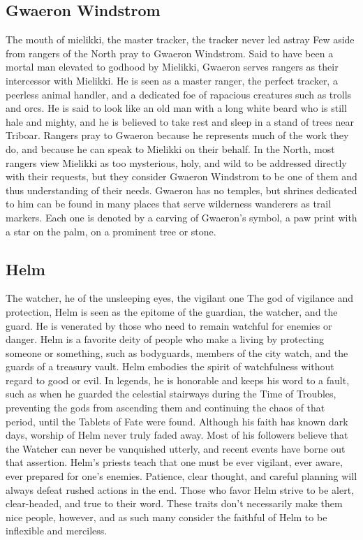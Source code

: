 \documentclass[10pt,a4paper,twoside,twocolumn,openany,bg=print,nodeprecatedcode]{dndbook}
\begin{document}
\subsection{Gwaeron Windstrom}
The mouth of mielikki, the master tracker, the tracker never led astray
Few aside from rangers of the North pray to Gwaeron Windstrom. Said to have been a mortal man elevated to godhood by Mielikki, Gwaeron serves rangers as their intercessor with Mielikki. He is seen as a master ranger, the perfect tracker, a peerless animal handler, and a dedicated foe of rapacious creatures such as trolls and orcs. He is said to look like an old man with a long white beard who is still hale and mighty, and he is believed to take rest and sleep in a stand of trees near Triboar.
Rangers pray to Gwaeron because he represents much of the work they do, and because he can speak to Mielikki on their behalf. In the North, most rangers view Mielikki as too mysterious, holy, and wild to be addressed directly with their requests, but they consider Gwaeron Windstrom to be one of them and thus understanding of their needs.
Gwaeron has no temples, but shrines dedicated to him can be found in many places that serve wilderness wanderers as trail markers. Each one is denoted by a carving of Gwaeron's symbol, a paw print with a star on the palm, on a prominent tree or stone.
\subsection{Helm}
The watcher, he of the unsleeping eyes, the vigilant one
The god of vigilance and protection, Helm is seen as the epitome of the guardian, the watcher, and the guard. He is venerated by those who need to remain watchful for enemies or danger. Helm is a favorite deity of people who make a living by protecting someone or something, such as bodyguards, members of the city watch, and the guards of a treasury vault.
Helm embodies the spirit of watchfulness without regard to good or evil. In legends, he is honorable and keeps his word to a fault, such as when he guarded the celestial stairways during the Time of Troubles, preventing the gods from ascending them and continuing the chaos of that period, until the Tablets of Fate were found.
Although his faith has known dark days, worship of Helm never truly faded away. Most of his followers believe that the Watcher can never be vanquished utterly, and recent events have borne out that assertion.
Helm's priests teach that one must be ever vigilant, ever aware, ever prepared for one's enemies. Patience, clear thought, and careful planning will always defeat rushed actions in the end. Those who favor Helm strive to be alert, clear-headed, and true to their word. These traits don't necessarily make them nice people, however, and as such many consider the faithful of Helm to be inflexible and merciless.
\end{document}
